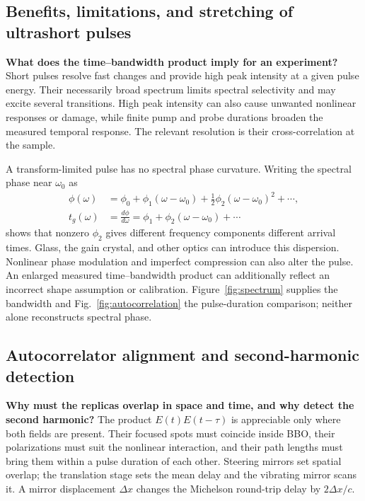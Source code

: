 \subsection{Benefits, limitations, and stretching of ultrashort pulses}
\textbf{What does the time--bandwidth product imply for an experiment?}
Short pulses resolve fast changes and provide high peak intensity at a given pulse energy. Their necessarily broad spectrum limits spectral selectivity and may excite several transitions. High peak intensity can also cause unwanted nonlinear responses or damage, while finite pump and probe durations broaden the measured temporal response. The relevant resolution is their cross-correlation at the sample.

A transform-limited pulse has no spectral phase curvature. Writing the spectral phase near $\omega_0$ as
\begin{align}
\phi(\omega)&=\phi_0+\phi_1(\omega-\omega_0)
 +\tfrac12\phi_2(\omega-\omega_0)^2+\cdots,\\
t_g(\omega)&=\frac{d\phi}{d\omega}
=\phi_1+\phi_2(\omega-\omega_0)+\cdots
\end{align}
shows that nonzero $\phi_2$ gives different frequency components different arrival times. Glass, the gain crystal, and other optics can introduce this dispersion. Nonlinear phase modulation and imperfect compression can also alter the pulse. An enlarged measured time--bandwidth product can additionally reflect an incorrect shape assumption or calibration. Figure~\ref{fig:spectrum} supplies the bandwidth and Fig.~\ref{fig:autocorrelation} the pulse-duration comparison; neither alone reconstructs spectral phase.

\subsection{Autocorrelator alignment and second-harmonic detection}
\textbf{Why must the replicas overlap in space and time, and why detect the second harmonic?}
The product $E(t)E(t-\tau)$ is appreciable only where both fields are present. Their focused spots must coincide inside BBO, their polarizations must suit the nonlinear interaction, and their path lengths must bring them within a pulse duration of each other. Steering mirrors set spatial overlap; the translation stage sets the mean delay and the vibrating mirror scans it. A mirror displacement $\Delta x$ changes the Michelson round-trip delay by $2\Delta x/c$.

